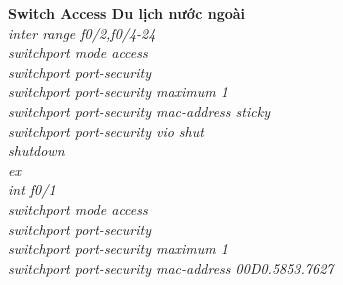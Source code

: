 \documentclass[a4paper, 12pt]{article}
\begin{document}
\hspace*{1cm}\textbf{Switch Access Du lịch nước ngoài}\\
\hspace*{2cm}\textit{inter range f0/2,f0/4-24\\
\hspace*{2cm}switchport mode access\\
\hspace*{2cm}switchport port-security\\
\hspace*{2cm}switchport port-security maximum 1\\
\hspace*{2cm}switchport port-security mac-address sticky\\
\hspace*{2cm}switchport port-security vio shut\\
\hspace*{2cm}shutdown\\
\hspace*{2cm}ex\\
\hspace*{2cm}int f0/1\\
\hspace*{2cm}switchport mode access\\
\hspace*{2cm}switchport port-security\\
\hspace*{2cm}switchport port-security maximum 1\\
\hspace*{2cm}switchport port-security mac-address 00D0.5853.7627\\}
\end{document}
